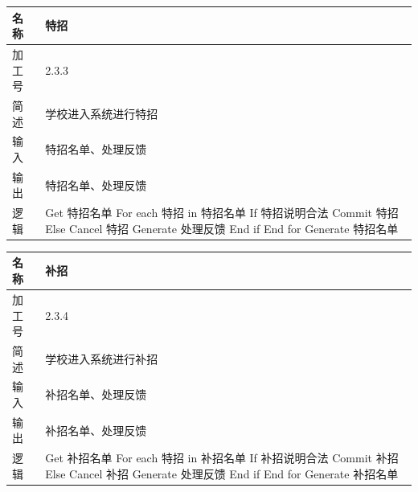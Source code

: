 \documentclass[CJK,utf8]{ctexrep}
\begin{document}
\begin{tabularx}{0.85\textwidth}{|l|X|}
	\hline
	\textbf{名称} & \textbf{特招} \\
	\hline
	加工号 & 2.3.3 \\
	\hline
	简述 & 学校进入系统进行特招 \\
	\hline
	输入 & 特招名单、处理反馈 \\
	\hline
	输出 & 特招名单、处理反馈 \\
	\hline
	\multirow{10}{*}{逻辑} & \ttfamily
	Get 特招名单 \newline
	For each 特招 in 特招名单 \newline
	\hspace*{0.6cm}If 特招说明合法 \newline
	\hspace*{1.2cm}Commit 特招 \newline
	\hspace*{0.6cm}Else \newline
	\hspace*{1.2cm}Cancel 特招 \newline
	\hspace*{1.2cm}Generate 处理反馈 \newline
	\hspace*{0.6cm}End if \newline
	End for \newline
	Generate 特招名单\\
	\hline
\end{tabularx}

\begin{tabularx}{0.85\textwidth}{|l|X|}
	\hline
	\textbf{名称} & \textbf{补招} \\
	\hline
	加工号 & 2.3.4 \\
	\hline
	简述 & 学校进入系统进行补招 \\
	\hline
	输入 & 补招名单、处理反馈 \\
	\hline
	输出 & 补招名单、处理反馈 \\
	\hline
	\multirow{10}{*}{逻辑} & \ttfamily
	Get 补招名单 \newline
	For each 特招 in 补招名单 \newline
	\hspace*{0.6cm}If 补招说明合法 \newline
	\hspace*{1.2cm}Commit 补招 \newline
	\hspace*{0.6cm}Else \newline
	\hspace*{1.2cm}Cancel 补招 \newline
	\hspace*{1.2cm}Generate 处理反馈 \newline
	\hspace*{0.6cm}End if \newline
	End for \newline
	Generate 补招名单\\
	\hline
\end{tabularx}
\end{document}
